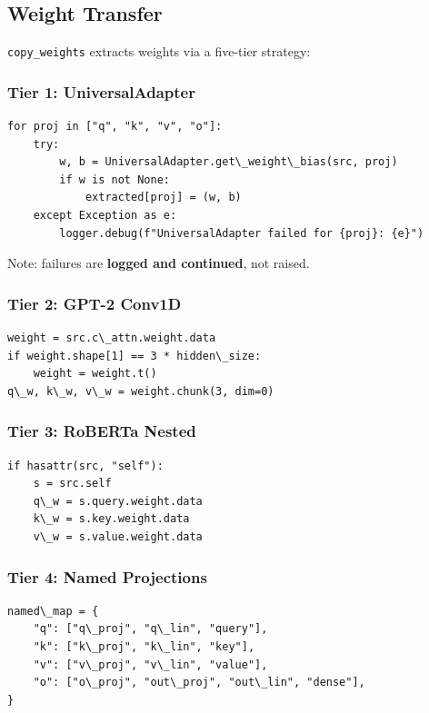 \subsection{Weight Transfer}

\texttt{copy\_weights} extracts weights via a five-tier strategy:

\subsubsection{Tier 1: UniversalAdapter}

\begin{lstlisting}
for proj in ["q", "k", "v", "o"]:
    try:
        w, b = UniversalAdapter.get\_weight\_bias(src, proj)
        if w is not None:
            extracted[proj] = (w, b)
    except Exception as e:
        logger.debug(f"UniversalAdapter failed for {proj}: {e}")
\end{lstlisting}

Note: failures are \textbf{logged and continued}, not raised.

\subsubsection{Tier 2: GPT-2 Conv1D}

\begin{lstlisting}
weight = src.c\_attn.weight.data
if weight.shape[1] == 3 * hidden\_size:
    weight = weight.t()
q\_w, k\_w, v\_w = weight.chunk(3, dim=0)
\end{lstlisting}

\subsubsection{Tier 3: RoBERTa Nested}

\begin{lstlisting}
if hasattr(src, "self"):
    s = src.self
    q\_w = s.query.weight.data
    k\_w = s.key.weight.data
    v\_w = s.value.weight.data
\end{lstlisting}

\subsubsection{Tier 4: Named Projections}

\begin{lstlisting}
named\_map = {
    "q": ["q\_proj", "q\_lin", "query"],
    "k": ["k\_proj", "k\_lin", "key"],
    "v": ["v\_proj", "v\_lin", "value"],
    "o": ["o\_proj", "out\_proj", "out\_lin", "dense"],
}
\end{lstlisting}

